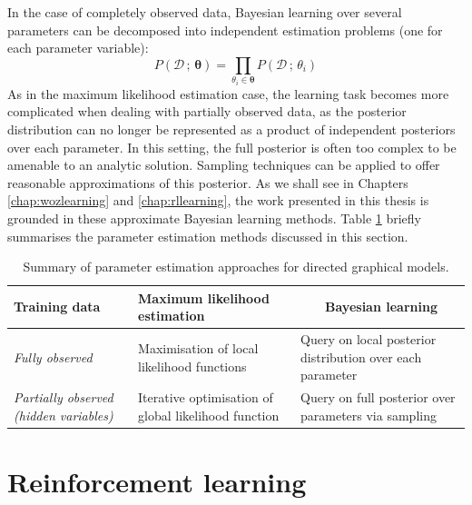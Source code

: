 In the case of completely observed data, Bayesian learning over several parameters can be decomposed into independent estimation problems (one for each parameter variable): 
\begin{equation}
P(\mathcal{D} \, ; \, \boldsymbol\theta) = \prod_{\theta_i \in \boldsymbol\theta} P(\mathcal{D} \, ; \, \theta_i)
\end{equation}
As in the maximum likelihood estimation case, the learning task becomes more complicated when dealing with partially observed data, as the posterior distribution can no longer be represented as a product of independent posteriors over each parameter.  In this setting, the full posterior is often too complex to be amenable to an analytic solution.  Sampling techniques can be applied to offer reasonable approximations of this posterior.  As we shall see in Chapters \ref{chap:wozlearning} and \ref{chap:rllearning}, the work presented in this thesis is grounded in these approximate Bayesian learning methods. Table \ref{table:gmlearning} briefly summarises the parameter estimation methods discussed in this section.

\begin{table}[ht]
\renewcommand{\arraystretch}{1.8}
\setlength{\tabcolsep}{10pt}
\vspace{3mm}
\begin{center}
\begin{tabular}{|p{30mm}||p{42mm}|p{48mm}|} \hline 
\centering \textbf{Training data} & \centering \textbf{Maximum likelihood estimation} &  $\ \ \ \ \ \ \ $ \textbf{Bayesian learning} \\ \hline
\textit{Fully observed} & Maximisation of local $\phantom{aa}$ likelihood functions & Query on local posterior distribution over each parameter \\
\textit{Partially observed $\phantom{b}$ (hidden variables)} &  Iterative optimisation of global likelihood function &  Query on full posterior over parameters via sampling \vspace{2mm} \\  \hline
\end{tabular}
\end{center}
\caption{Summary of parameter estimation approaches for directed graphical models.}
\label{table:gmlearning}
\end{table}


\section{Reinforcement learning}
\label{sec:rl}


